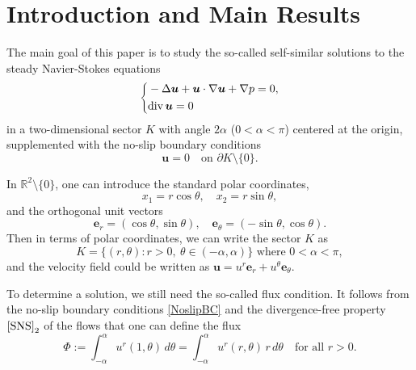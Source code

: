 \documentclass[reqno,12pt]{amsart}
\renewcommand{\div}{{\rm div \thinspace }}
\newcommand{\Bu}{{\boldsymbol{u}}}
\newcommand{\Be}{{\boldsymbol{e}}}
\begin{document}
\maketitle


\section{Introduction and Main Results}\label{secintroduction}
The main goal of this paper is to study the so-called self-similar solutions to the steady Navier-Stokes equations
    \begin{equation}
     \label{SNS}
     \left\{
     \begin{aligned}
          &     -\Delta\Bu + \Bu \cdot \nabla \Bu
         + \nabla p =0,
         \\
         &  \div \Bu=0  
        \end{aligned}
    \right.  
    \end{equation}
in a two-dimensional sector $K$ with angle $2\alpha$ ($0<\alpha<\pi$) centered at the origin,   supplemented with the no-slip boundary conditions
  \begin{equation}\label{NoslipBC}
  \Bu=0\quad \text{on}\,\, \partial K\setminus \{0\}.
  \end{equation} 
  
   In $\mathbb{R}^2\setminus \{0\}$, one can introduce the standard polar coordinates, 
\[
x_1=r \cos \theta, \quad x_2=r \sin\theta,
\]
and the orthogonal unit vectors
\[
\Be_r =(\cos \theta, \sin\theta), \quad \Be_\theta=(-\sin \theta, \cos\theta).
\]
Then in terms of polar coordinates, we can write the sector $K$ as
\begin{equation}\label{eq:sec}
     K =\{(r, \theta): r>0, ~ \theta \in (-\alpha, \alpha)\} \textrm{ where } 0<\alpha<\pi,
 \end{equation}
 and the velocity field could be written as $\Bu =u^r \Be_r +u^\theta \Be_\theta$. 

To determine a solution, we still need the so-called flux condition. It follows from the  no-slip boundary conditions \eqref{NoslipBC} and the divergence-free property ${\eqref{SNS}}_2$ of the flows that one can define the flux
\begin{equation}\label{eq:flux}
            \Phi:= \int _{-\alpha}^{\alpha} u^r(1, \theta) \, d\theta =  \int _{-\alpha}^{\alpha} u^r(r,\theta) \, r\, d\theta \quad \text{for all}\,\, r>0.
 \end{equation}
\end{document}
